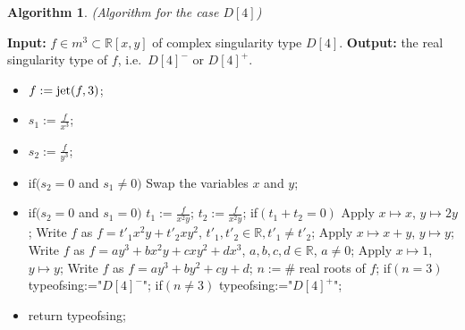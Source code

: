 \documentclass{amsproc}
\begin{document}
\newtheorem{D[4]}[kjet]{Algorithm}
\begin{D[4]}(Algorithm for the case $D[4]$)
\end{D[4]}
\noindent\textnormal{\bf Input:} $f\in m^3\subset\mathbb R[x,y]$ of complex singularity type $D[4]$.\newline
\textnormal{\bf Output:} the real singularity type of $f$, i.e.~$D[4]^-$ or $D[4]^+$.
\begin{itemize}
\item $f := \textnormal{jet}(f,3)$;
\item $s_1:= \frac{f}{x^3}$;
\item $s_2 := \frac{f}{y^3}$;
\item if$(s_2=0$ and $s_1\neq0)$\newline
\phantom{}\quad Swap the variables $x$ and $y$;
\item   if$(s_2=0$ and $s_1=0)$\newline
\phantom{}\quad $t_1:=\frac{f}{x^2y}$;\newline
\phantom{}\quad $t_2:=\frac{f}{x^2y}$;\newline
\phantom{}\quad if$(t_1+t_2=0)$\newline
\phantom{}\quad\quad Apply $x\mapsto x$, $y\mapsto 2y$;\newline
\phantom{}\quad\quad Write $f$ as $f=t'_1x^2y+t'_2xy^2$, $t'_1, t'_2\in\mathbb R, t'_1\neq t'_2$;\newline
\phantom{}\quad Apply $x\mapsto x+y$, $y\mapsto y$;\newline
\phantom{}\quad Write $f$ as $f=ay^3+bx^2y+cxy^2+dx^3$, $a,b,c,d\in\mathbb R$, $a\neq 0$;\newline
\phantom{}\quad Apply $x\mapsto 1$, $y\mapsto y$;\newline
\phantom{}\quad Write $f$ as $f=ay^3+by^2+cy+d$;\newline
\phantom{}\quad $n:= \#$ real roots of $f$;\newline
\phantom{}\quad if$(n=3)$\newline
\phantom{}\quad\quad typeofsing:="$D[4]^-$";\newline
\phantom{}\quad if$(n\neq 3)$\newline
\phantom{}\quad\quad typeofsing:="$D[4]^+$";
\item return typeofsing;
\end{itemize}
\end{document}
